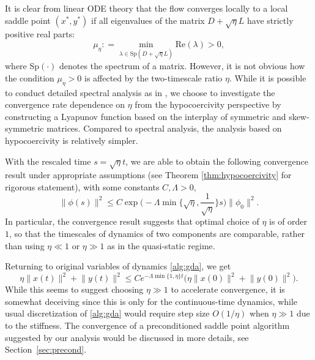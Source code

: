 \documentclass[11pt]{article}
\newcommand{\norm}[1]{\lVert#1\rVert}
\newcommand{\1}{\mathds{1}}
\begin{document}
It is clear from linear ODE theory that the flow converges locally to a local saddle point $(x^*, y^*)$ if all eigenvalues of the matrix $D+\sqrt{\eta}L$ have strictly positive real parts:
\begin{equation}
    \mu_\eta: = \min_{\lambda \in \text{Sp}(D+\sqrt{\eta} L)} \text{Re}(\lambda) >0,
\end{equation}
where Sp$(\cdot)$ denotes the spectrum of a matrix. However, it is not obvious how the condition $\mu_\eta>0$ is affected by the two-timescale ratio $\eta$. While it is possible to conduct detailed spectral analysis as in \cite{wang2024local}, we choose to investigate the convergence rate dependence on $\eta$ from the hypocoercivity perspective \cite{villani2009hypocoercivity, dolbeault2015hypocoercivity} by constructing a Lyapunov function based on the interplay of symmetric and skew-symmetric matrices. Compared to spectral analysis, the analysis based on hypocoercivity is relatively simpler.
 
With the rescaled time $s=\sqrt{\eta} t$, we are able to obtain the following convergence result under appropriate assumptions (see Theorem \ref{thm:hypocoercivity} for rigorous statement), with some constants $C, \Lambda>0$,
\begin{equation*}
  \|\phi(s)\|^2 \leq C \exp\Big(-\Lambda \min\Big\{\sqrt{\eta}, \frac{1}{\sqrt{\eta}}\Big\} s \Big)\|\phi_0\|^2.
\end{equation*}
In particular, the convergence result suggests that optimal choice of $\eta$ is of order $1$, so that the timescales of dynamics of two components are comparable, rather than using $\eta \ll 1$ or $\eta \gg 1$ as in the quasi-static regime.


Returning to original variables of dynamics \eqref{alg:gda}, we get
\begin{equation}\label{eq:decaygame}
    \eta \norm{x(t)}^2 + \norm{y(t)}^2 \leq C e^{- \Lambda \min \{1, \eta \} t} \bigl(\eta \norm{x(0)}^2 + \norm{y(0)}^2 \bigr).
\end{equation}
While this seems to suggest choosing $\eta \gg 1$ to accelerate convergence, it is somewhat deceiving since this is only for the continuous-time dynamics, while usual discretization of \eqref{alg:gda} would require step size $O(1/\eta)$ when $\eta \gg 1$ due to the stiffness. The convergence of a preconditioned saddle point algorithm suggested by our analysis would be discussed in more details, see Section~\ref{sec:precond}.
\end{document}
